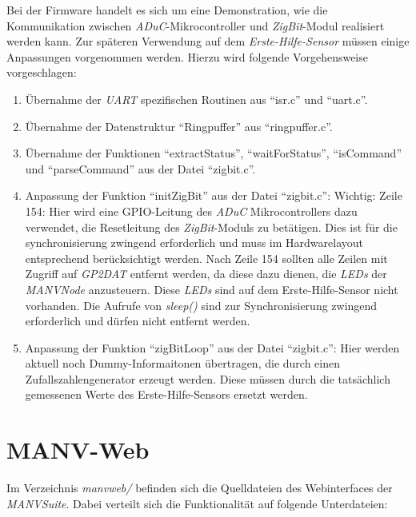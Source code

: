     Bei der Firmware handelt es sich um eine Demonstration, wie die Kommunikation zwischen \emph{ADuC}-Mikrocontroller
    und \emph{ZigBit}-Modul realisiert werden kann. Zur späteren Verwendung auf dem \emph{Erste-Hilfe-Sensor} müssen 
    einige Anpassungen vorgenommen werden. Hierzu wird folgende Vorgehensweise vorgeschlagen:

    \begin{enumerate}
        \item Übernahme der \emph{UART} spezifischen Routinen aus "`isr.c"' und "`uart.c"'. 
        \item Übernahme der Datenstruktur "`Ringpuffer"' aus "`ringpuffer.c"'.
        \item Übernahme der Funktionen "`extractStatus"', "`waitForStatus"', "`isCommand"'
              und "`parseCommand"' aus der Datei "`zigbit.c"'.
        \item Anpassung der Funktion "`initZigBit"' aus der Datei "`zigbit.c"':
              Wichtig: Zeile 154: Hier wird eine GPIO-Leitung des \emph{ADuC} Mikrocontrollers dazu verwendet,
              die Resetleitung des \emph{ZigBit}-Moduls zu betätigen. Dies ist für die synchronisierung
              zwingend erforderlich und muss im Hardwarelayout entsprechend berücksichtigt werden.
              Nach Zeile 154 sollten alle Zeilen mit Zugriff auf \emph{GP2DAT} entfernt werden, 
              da diese dazu dienen, die \emph{LEDs} der \emph{MANVNode} anzusteuern. Diese \emph{LEDs} sind
              auf dem Erste-Hilfe-Sensor nicht vorhanden. Die Aufrufe von \emph{sleep()} sind zur Synchronisierung
              zwingend erforderlich und dürfen nicht entfernt werden.
        \item Anpassung der Funktion "`zigBitLoop"' aus der Datei "`zigbit.c"': Hier werden aktuell noch 
              Dummy-Informaitonen übertragen, die durch einen Zufallszahlengenerator erzeugt werden. Diese
              müssen durch die tatsächlich gemessenen Werte des Erste-Hilfe-Sensors ersetzt werden.
    \end{enumerate}                


    \section{MANV-Web}
    Im Verzeichnis \emph{manvweb/} befinden sich die Quelldateien des Webinterfaces der
    \emph{MANVSuite}. Dabei verteilt sich die Funktionalität auf folgende Unterdateien:

